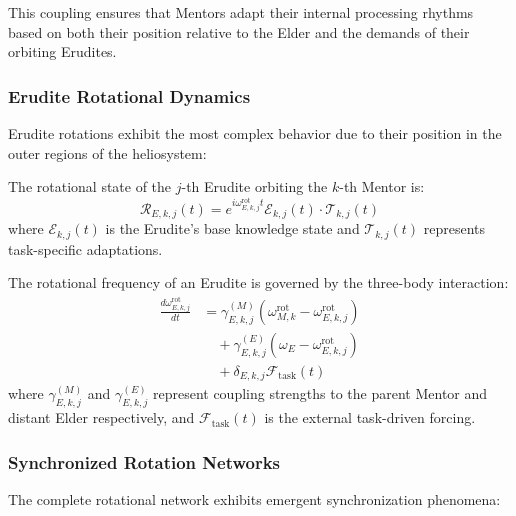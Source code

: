 This coupling ensures that Mentors adapt their internal processing rhythms based on both their position relative to the Elder and the demands of their orbiting Erudites.

\subsubsection{Erudite Rotational Dynamics}

Erudite rotations exhibit the most complex behavior due to their position in the outer regions of the heliosystem:

\begin{definition}
The rotational state of the $j$-th Erudite orbiting the $k$-th Mentor is:
\begin{equation}
\mathcal{R}_{E,k,j}(t) = e^{i\omega_{E,k,j}^{\text{rot}} t} \mathcal{E}_{k,j}(t) \cdot \mathcal{T}_{k,j}(t)
\end{equation}
where $\mathcal{E}_{k,j}(t)$ is the Erudite's base knowledge state and $\mathcal{T}_{k,j}(t)$ represents task-specific adaptations.
\end{definition}

\begin{theorem}
The rotational frequency of an Erudite is governed by the three-body interaction:
\begin{align}
\frac{d\omega_{E,k,j}^{\text{rot}}}{dt} &= \gamma_{E,k,j}^{(M)} \left(\omega_{M,k}^{\text{rot}} - \omega_{E,k,j}^{\text{rot}}\right) \\
&\quad + \gamma_{E,k,j}^{(E)} \left(\omega_E - \omega_{E,k,j}^{\text{rot}}\right) \\
&\quad + \delta_{E,k,j} \mathcal{F}_{\text{task}}(t)
\end{align}
where $\gamma_{E,k,j}^{(M)}$ and $\gamma_{E,k,j}^{(E)}$ represent coupling strengths to the parent Mentor and distant Elder respectively, and $\mathcal{F}_{\text{task}}(t)$ is the external task-driven forcing.
\end{theorem}

\subsubsection{Synchronized Rotation Networks}

The complete rotational network exhibits emergent synchronization phenomena:

